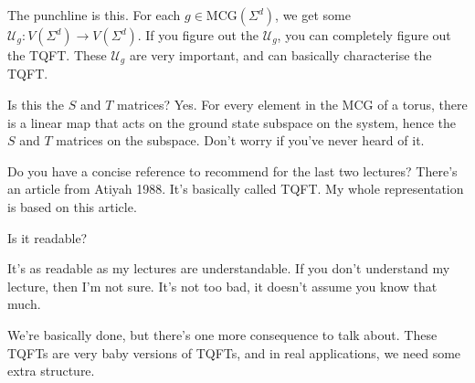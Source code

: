 The punchline is this.
For each $g\in \mathrm{MCG}(\Sigma^d)$,
we get some $\mathcal{U}_g: V(\Sigma^d) \to V(\Sigma^d)$.
If you figure out the $\mathcal{U}_g$,
you can completely figure out the TQFT.
These $\mathcal{U}_g$ are very important,
and can basically characterise the TQFT.

Is this the $S$ and $T$ matrices?
Yes.
For every element in the MCG  of a torus,
there is a linear map that acts on the ground state subspace on the system,
hence the $S$ and $T$ matrices on the subspace.
Don't worry if you've never heard of it.

Do you have a concise reference to recommend for the last two lectures?
There's an article from Atiyah 1988.
It's basically called TQFT.
My whole representation is based on this article.

\begin{question}
    Is it readable?
\end{question}
It's as readable as my lectures are understandable.
If you don't understand my lecture,
then I'm not sure.
It's not too bad,
it doesn't assume you know that much.

We're basically done,
but there's one more consequence to talk about.
These TQFTs are very baby versions of TQFTs,
and in real applications, we need some extra structure.
